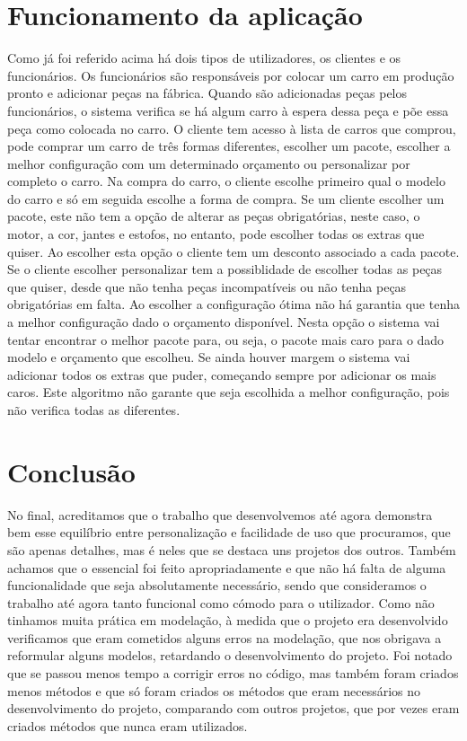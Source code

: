 \documentclass[10pt, a4paper]{article}
\begin{document}
\section{Funcionamento da aplicação}
Como já foi referido acima há dois tipos de utilizadores, os clientes e os funcionários. Os funcionários são responsáveis por colocar um carro em produção pronto e adicionar peças na fábrica. Quando são adicionadas peças pelos funcionários, o sistema verifica se há algum carro à espera dessa peça e põe essa peça como colocada no carro. O cliente tem acesso à lista de carros que comprou, pode comprar um carro de três formas diferentes, escolher um pacote, escolher a melhor configuração com um determinado orçamento ou personalizar por completo o carro. Na compra do carro, o cliente escolhe primeiro qual o modelo do carro e só em seguida escolhe a forma de compra. Se um cliente escolher um pacote, este não tem a opção de alterar as peças obrigatórias, neste caso, o motor, a cor, jantes e estofos, no entanto, pode escolher todas os extras que quiser. Ao escolher esta opção o cliente tem um desconto associado a cada pacote. Se o cliente escolher personalizar tem a possiblidade de escolher todas as peças que quiser, desde que não tenha peças incompatíveis ou não tenha peças obrigatórias em falta. Ao escolher a configuração ótima não há garantia que tenha a melhor configuração dado o orçamento disponível. Nesta opção o sistema vai tentar encontrar o melhor pacote para, ou seja, o pacote mais caro para o dado modelo e orçamento que escolheu. Se ainda houver margem o sistema vai adicionar todos os extras que puder, começando sempre por adicionar os mais caros. Este algoritmo não garante que seja escolhida a melhor configuração, pois não verifica todas as diferentes.


\newpage
\section{Conclusão}\label{analise}
No final, acreditamos que o trabalho que desenvolvemos até agora demonstra bem esse equilíbrio entre personalização e facilidade de uso que procuramos, que são apenas detalhes, mas é neles que se destaca uns projetos dos outros. Também achamos que o essencial foi feito apropriadamente e que não há falta de alguma funcionalidade que seja absolutamente necessário, sendo que consideramos o trabalho até agora tanto funcional como cómodo para o utilizador. Como não tinhamos muita prática em modelação, à medida que o projeto era desenvolvido verificamos que eram cometidos alguns erros na modelação, que nos obrigava a reformular alguns modelos, retardando o desenvolvimento do projeto. Foi notado que se passou menos tempo a corrigir erros no código, mas também foram criados menos métodos e que só foram criados os métodos que eram necessários no desenvolvimento do projeto, comparando com outros projetos, que por vezes eram criados métodos que nunca eram utilizados.
\end{document}
